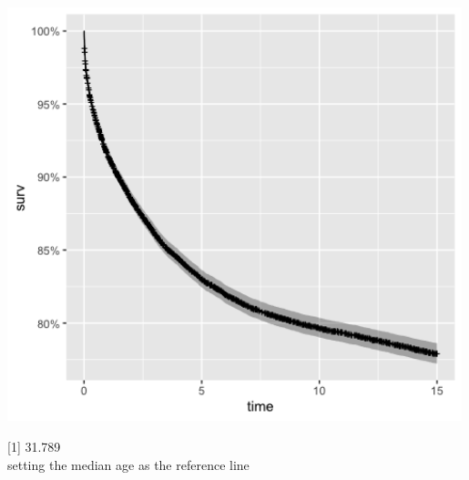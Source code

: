 \documentclass[12pt,letterpaper]{article}
\begin{document}

\includegraphics[width=0.99\textwidth]{autoplot(cox_fit)_PS04.png}

[1] 31.789\\
setting the median age as the reference line\\
\end{document}
